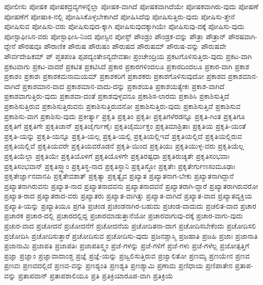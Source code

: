 {ಪೋಲೀಸು
ಪೋಷಕ
ಪೋಷಕದ್ರವ್ಯಗಳನ್ನೆಲ್ಲಾ
ಪೋಷಕ-ವಾಗಿದೆ
ಪೋಷಕವಾಗಿದೆಯೇ
ಪೋಷಕವಾಗಿರು-ವುದು
ಪೋಷಣೆ
ಪೋಷಣೆಗೆ
ಪೋಷಾಕಿ-ನಲ್ಲಿ
ಪೋಷಿಸಿಕೊಳ್ಳಬೇಕಾಗಿದೆ
ಪೋಷಿಸಿದೆವು
ಪೋಷಿಸುತ್ತಿರು-ವುದು
ಪೋಷಿಸು-ತ್ತೇನೆ
ಪೋಷಿಸುವ
ಪೋಷಿಸು-ವರು
ಪೋಷಿಸುವುದ-ಕ್ಕಾಗಿ
ಪೋಷಿಸುವುದಕ್ಕಾಗಿಯೇ
ಪೋಷಿಸುವು-ದಕ್ಕೆ
ಪೋಷಿಸು-ವುದು
ಪೋಸ್ಟಾಫೀಸಿನ-ವರು
ಪೋಸ್ಟಾಫೀಸಿ-ನಿಂದ
ಪೋಸ್ಟಿನ
ಪೋಸ್ಟ್
ಪೌಂಡ್ರಂ
ಪೌಂಡ್ರಕ-ವನ್ನು
ಪೌತ್ರಾ
ಪೌತ್ರಾನ್
ಪೌರಷವಾಗಿ-ದ್ದೇನೆ
ಪೌರಷವೂ
ಪೌರಾಣಿಕ
ಪೌರುಷ
ಪೌರುಷಂ
ಪೌರುಷದ
ಪೌರುಷಮ್
ಪೌರುಷ-ವನ್ನು
ಪೌರುಷವೇ
ಪೌರ್ವದೇಹಿಕಮ್
ಪ್
ಪ್ತತಪಂತಿ
ಪ್ಪಪದ್ಯಂತೇಽನ್ಯದೇವತಾಃ
ಪ್ರಂಚೇಂದ್ರಿಯ
ಪ್ರಕಟಗೊಳಿಸುತ್ತಿರು-ವುದು
ಪ್ರಕಟ-ವಾಗಿ
ಪ್ರಕಟವಾಗು
ಪ್ರಕಟ-ವಾದರೆ
ಪ್ರಕಟಿತ
ಪ್ರಕಟಿಸಿದೆ
ಪ್ರಕಾರ
ಪ್ರಕಾರಗಳಿಂದಲೂ
ಪ್ರಕಾರದಿಂದಲೂ
ಪ್ರಕಾರ-ವಾಗಿ
ಪ್ರಕಾಶ
ಪ್ರಕಾಶಂ
ಪ್ರಕಾಶಃ
ಪ್ರಕಾಶಕಮನಾಮಯಮ್
ಪ್ರಕಾಶಕರಿಗೆ
ಪ್ರಕಾಶಕರು
ಪ್ರಕಾಶಗೊಳಿಸುವುದೋ
ಪ್ರಕಾಶದ
ಪ್ರಕಾಶಮಾನ-ವಾಗಿದೆ
ಪ್ರಕಾಶಮಾನ-ವಾದ
ಪ್ರಕಾಶಮಾನ-ವಾದು-ದನ್ನು
ಪ್ರಕಾಶಯತಿ
ಪ್ರಕಾಶಯತ್ಯೇಕಃ
ಪ್ರಕಾಶ-ವಾಗಿದೆ
ಪ್ರಕಾಶವಾಗುತ್ತಿರು-ವುದು
ಪ್ರಕಾಶವಾ-ದಂತೆ
ಪ್ರಕಾಶವುಳ್ಳವನೂ
ಪ್ರಕಾಶಿಸ-ಲಾರದು
ಪ್ರಕಾಶಿಸಿ
ಪ್ರಕಾಶಿಸುತ್ತಿದೆ
ಪ್ರಕಾಶಿಸುತ್ತಿರುವ
ಪ್ರಕಾಶಿಸುತ್ತಿರುವನು
ಪ್ರಕಾಶಿಸುತ್ತಿರುವನೋ
ಪ್ರಕಾಶಿಸುತ್ತಿರು-ವುದು
ಪ್ರಕಾಶಿಸುತ್ತಿವೆ
ಪ್ರಕಾಶಿಸುವ
ಪ್ರಕಾಶಿಸು-ವಾಗ
ಪ್ರಕಾಶಿಸು-ವುದು
ಪ್ರಕೀರ್ತ್ಯಾ
ಪ್ರಕೃತಿ
ಪ್ರಕೃತಿಂ
ಪ್ರಕೃತಿಃ
ಪ್ರಕೃತಿಗಳೆರಡನ್ನೂ
ಪ್ರಕೃತಿ-ಗಿಂತ
ಪ್ರಕೃತಿಗೂ
ಪ್ರಕೃತಿಗೆ
ಪ್ರಕೃತಿಗೇ
ಪ್ರಕೃತಿಜಾನ್
ಪ್ರಕೃತಿಜೈರ್ಗುಣೈಃ
ಪ್ರಕೃತಿಜೈರ್ಮುಕ್ತಂ
ಪ್ರಕೃತಿಮಾಶ್ರಿತಾಃ
ಪ್ರಕೃತಿಯ
ಪ್ರಕೃತಿ-ಯಂತೆ
ಪ್ರಕೃತಿ-ಯನ್ನು
ಪ್ರಕೃತಿ-ಯನ್ನೂ
ಪ್ರಕೃತಿ-ಯಲ್ಲ
ಪ್ರಕೃತಿ-ಯಲ್ಲಿ
ಪ್ರಕೃತಿಯಲ್ಲಿಇವೆ
ಪ್ರಕೃತಿಯಲ್ಲಿದೆ
ಪ್ರಕೃತಿಯಲ್ಲಿರುವ
ಪ್ರಕೃತಿಯಲ್ಲಿವೆ
ಪ್ರಕೃತಿಯವರೇ
ಪ್ರಕೃತಿಯವರೊಡನೆ
ಪ್ರಕೃತಿ-ಯಿಂದ
ಪ್ರಕೃತಿಯು
ಪ್ರಕೃತಿಯುಳ್ಳ-ವರು
ಪ್ರಕೃತಿಯೆಲ್ಲ
ಪ್ರಕೃತಿಯೆಲ್ಲಾ
ಪ್ರಕೃತಿಯೇ
ಪ್ರಕೃತಿಯೊಳಗೆ
ಪ್ರಕೃತಿಯೊಳಗೇ
ಪ್ರಕೃತಿರಷ್ಟಧಾ
ಪ್ರಕೃತಿರುಚ್ಯತೇ
ಪ್ರಕೃತಿಸಂಭವಾಃ
ಪ್ರಕೃತಿಸಂಭವಾನ್
ಪ್ರಕೃತಿಸ್ತ್ವಾಂ
ಪ್ರಕೃತಿಸ್ಥ-ನಾದ
ಪ್ರಕೃತಿಸ್ಥಾನಿ
ಪ್ರಕೃತಿಸ್ಥೋ
ಪ್ರಕೃತೇಃ
ಪ್ರಕೃತೇರ್ಗುಣಸಂಮೂಢಾಃ
ಪ್ರಕೃತೇರ್ಜ್ಞಾನವಾನಪಿ
ಪ್ರಕೃತೇವಶಾತ್
ಪ್ರಕೃತ್ಯಾ
ಪ್ರಕೃತ್ಯೈವ
ಪ್ರಖ್ಯಾತ
ಪ್ರಖ್ಯಾತನಾಗ-ಬೇಕು
ಪ್ರಖ್ಯಾತನಾಗಿದ್ದಾನೆ
ಪ್ರಖ್ಯಾತನಾಗಿರುವನು
ಪ್ರಖ್ಯಾತ-ನಾದ
ಪ್ರಖ್ಯಾತನಾದವನು
ಪ್ರಖ್ಯಾತನಾದವನೆ
ಪ್ರಖ್ಯಾತರಾಗಿ-ದ್ದಾರೆ
ಪ್ರಖ್ಯಾತರಾಗಿರುವರೋ
ಪ್ರಖ್ಯಾತ-ರಾದ
ಪ್ರಖ್ಯಾತರಾದ-ವರು
ಪ್ರಖ್ಯಾತರು
ಪ್ರಖ್ಯಾತ-ವಾಗಿತ್ತು
ಪ್ರಖ್ಯಾತ-ವಾಗಿದೆ
ಪ್ರಖ್ಯಾತ-ವಾದ
ಪ್ರಖ್ಯಾತವ್ಯಕ್ತಿಯ
ಪ್ರಖ್ಯಾತಿ-ಯನ್ನು
ಪ್ರಖ್ಯಾತಿಯೂ
ಪ್ರಗತಿ
ಪ್ರಚಂಡ
ಪ್ರಚಂಡನಾಗಿರ-ಬಹುದು
ಪ್ರಚಂಡ-ವಾದುದು
ಪ್ರಚಲಿತ-ವಾದ
ಪ್ರಚಾರ
ಪ್ರಚಾರಕ
ಪ್ರಚಾರ-ದಲ್ಲಿ
ಪ್ರಚಾರದಲ್ಲಿದ್ದ
ಪ್ರಚಾರಮಾಡುತ್ತಾನೆಯೋ
ಪ್ರಚಾರವಾಗುವು-ದಕ್ಕೆ
ಪ್ರಚಾರ-ವಾಗು-ವುದು
ಪ್ರಚುರ-ವಾದ
ಪ್ರಚೋದನೆ
ಪ್ರಚೋದನೆಗೆ
ಪ್ರಚೋದನೆಯ
ಪ್ರಚೋದಿತನಾ-ದಾಗ
ಪ್ರಚೋದಿಸಬೇಕೆಂದು
ಪ್ರಚೋದಿಸಲಿ
ಪ್ರಚೋದಿಸಿ
ಪ್ರಚೋದಿಸುತ್ತಾರೆ
ಪ್ರಚೋದಿಸುವ
ಪ್ರಚೋದಿಸು-ವುದು
ಪ್ರಜನಶ್ಚಾಸ್ಮಿ
ಪ್ರಜಹಾತಿ
ಪ್ರಜಹಿ
ಪ್ರಜಾಃ
ಪ್ರಜಾನಾತಿ
ಪ್ರಜಾನಾಮಿ
ಪ್ರಜಾಪತಿ
ಪ್ರಜಾಪತಿಃ
ಪ್ರಜಾಪತಿಸ್ತ್ವಂ
ಪ್ರಜೆ-ಗಳನ್ನು
ಪ್ರಜೆ-ಗಳಿಗೆ
ಪ್ರಜೆ-ಗಳು
ಪ್ರಜೆ-ಗಳೆಲ್ಲ
ಪ್ರಜೋತ್ಪತ್ತಿಗೆ
ಪ್ರಜ್ಞಾ
ಪ್ರಜ್ಞಾಂ
ಪ್ರಜ್ಞಾವಾದಾಂಶ್ಚ
ಪ್ರಜ್ಞೆ
ಪ್ರಜ್ಞೆ-ಯನ್ನು
ಪ್ರಜ್ವಲಿಸುತ್ತಿರುವ
ಪ್ರಜ್ವಾಲಿತೋ
ಪ್ರಣಮ್ಯ
ಪ್ರಣಯೇನ
ಪ್ರಣವ
ಪ್ರಣವಃ
ಪ್ರಣವದಲ್ಲಿದೆ
ಪ್ರಣವ-ವನ್ನು
ಪ್ರಣಶ್ಯಂತಿ
ಪ್ರಣಶ್ಯತಿ
ಪ್ರಣಶ್ಯಾಮಿ
ಪ್ರಣಾಮ
ಪ್ರಣಿಧಾಯ
ಪ್ರಣಿಪಾತೇನ
ಪ್ರತಾಪ-ವನ್ನು
ಪ್ರತಾಪವಾನ್
ಪ್ರತಾಪಶಾಲಿಯೂ
ಪ್ರತಿ
ಪ್ರತಿಕ್ರಿಯಾರೂಪ-ವಾಗಿ
ಪ್ರತಿಕ್ರಿಯೆ
}
